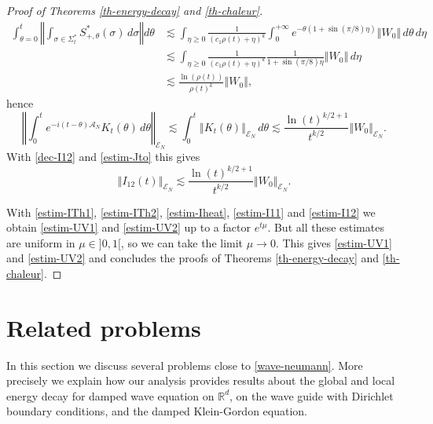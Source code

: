 \documentclass[10pt, a4paper,reqno]{amsart}
\theoremstyle{plain}
\theoremstyle{definition}
\theoremstyle{remark}
\begin{document}
\begin{proof}[Proof of Theorems \ref{th-energy-decay} and \ref{th-chaleur}]
\begin{align*}
\int_{{\theta} = 0}^t {\left\Vert {\int_{\sigma \in \Sigma_t^*} S_{+,{\theta}}^*(\sigma) \, d\sigma}\right\Vert} d{\theta} 
& \lesssim \int_{{\eta} {\geqslant} 0} \frac 1 {(c_1\rho(t) + {\eta})^k} \int_0^{+\infty} e^{-{\theta} (1+\sin(\pi/8) {\eta})} {\left\Vert {W_0}\right\Vert} \, d{\theta}  \, d{\eta}\\
& \lesssim \int_{{\eta} {\geqslant} 0} \frac 1 {(c_1\rho(t) + {\eta})^k} \frac 1 {1 + \sin(\pi/8) {\eta}} {\left\Vert {W_0}\right\Vert}  \, d{\eta} \\
& \lesssim \frac {\ln(\rho(t))}{\rho(t)^k} {\left\Vert {W_0}\right\Vert},
\end{align*}
hence
\begin{equation*} 
{\left\Vert {\int_0^t e^{-i(t-{\theta}){{{\mathcal A}}_N}} K_t({\theta}) \, d{\theta}}\right\Vert}_{\mathscr E_N} \lesssim \int_0^t {\left\Vert {K_t({\theta})}\right\Vert}_{\mathscr E_N} \, d{\theta} \lesssim \frac{\ln(t)^{k/2+1}}{t^{k/2}} {\left\Vert {W_0}\right\Vert}_{\mathscr E_N}.
\end{equation*}
With \eqref{dec-I12} and \eqref{estim-Jto} this gives 
\begin{equation} \label{estim-I12}
{\left\Vert {I_{12}(t)}\right\Vert}_{\mathscr E_N} \lesssim \frac{\ln(t)^{k/2+1}}{t^{k/2}} {\left\Vert {W_0}\right\Vert}_{\mathscr E_N}.
\end{equation}

{\noindent {\bf $\bullet$}\quad } With \eqref{estim-ITh1}, \eqref{estim-ITh2}, \eqref{estim-Iheat}, \eqref{estim-I11} and \eqref{estim-I12} we obtain \eqref{estim-UV1} and \eqref{estim-UV2} up to a factor $e^{t{\mu}}$. But all these estimates are uniform in ${\mu} \in ]0,1[$, so we can take the limit ${\mu} \to 0$. This gives \eqref{estim-UV1} and \eqref{estim-UV2} and concludes the proofs of Theorems \ref{th-energy-decay} and \ref{th-chaleur}.
\end{proof}

\section{Related problems} \label{sec-dirichlet}

In this section we discuss several problems close to \eqref{wave-neumann}. More precisely we explain how our analysis provides results about the global and local energy decay for damped wave equation on ${\mathbb{R}}^d$, on the wave guide with Dirichlet boundary conditions, and the damped Klein-Gordon equation.\\
\end{document}
